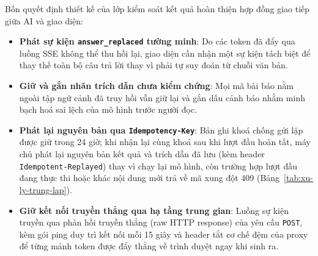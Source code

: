 Bốn quyết định thiết kế của lớp kiểm soát kết quả hoàn thiện hợp đồng giao tiếp giữa AI và giao diện:
\begin{itemize}
    \item[--] \textbf{Phát sự kiện \texttt{answer\_replaced} tường minh}: Do các token đã đẩy qua luồng SSE không thể thu hồi lại, giao diện cần nhận một sự kiện tách biệt để thay thế toàn bộ câu trả lời thay vì phải tự suy đoán từ chuỗi văn bản.
    \item[--] \textbf{Giữ và gắn nhãn trích dẫn chưa kiểm chứng}: Mọi mã bài báo nằm ngoài tập ngữ cảnh đã truy hồi vẫn giữ lại và gắn dấu cảnh báo nhằm minh bạch hoá sai lệch của mô hình trước người đọc.
    \item[--] \textbf{Phát lại nguyên bản qua \texttt{Idempotency-Key}}: Bản ghi khoá chống gửi lặp được giữ trong 24 giờ; khi nhận lại cùng khoá sau khi lượt đầu hoàn tất, máy chủ phát lại nguyên bản kết quả và trích dẫn đã lưu (kèm header \texttt{Idempotent-Replayed}) thay vì chạy lại mô hình, còn trường hợp lượt đầu đang thực thi hoặc khác nội dung mới trả về mã xung đột 409 (Bảng~\ref{tab:xu-ly-trung-lap}).
    \item[--] \textbf{Giữ kết nối truyền thẳng qua hạ tầng trung gian}: Luồng sự kiện truyền qua phản hồi truyền thẳng (raw HTTP response) của yêu cầu \texttt{POST}, kèm gói ping duy trì kết nối mỗi 15 giây và header tắt cơ chế đệm của proxy để từng mảnh token được đẩy thẳng về trình duyệt ngay khi sinh ra.
\end{itemize}

